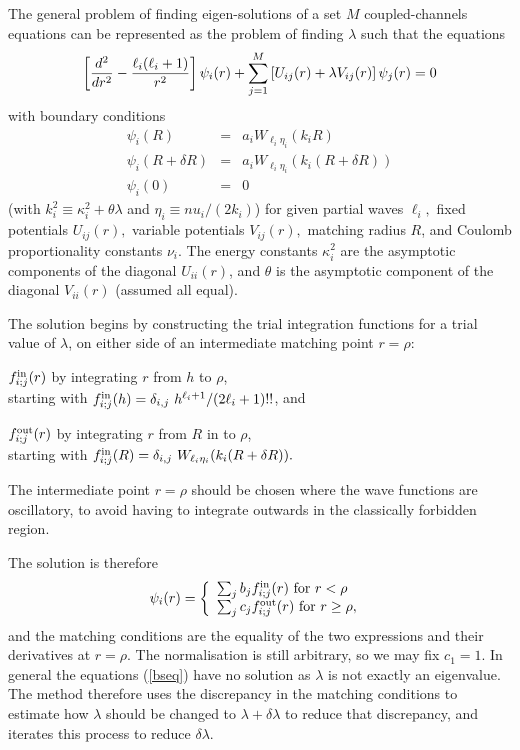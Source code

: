 \documentclass[11pt,a4paper]{article}
\begin{document}
The general problem of finding eigen-solutions of a set $M$
coupled-channels equations can be represented as the problem of finding
$\lambda$ such that the equations
\begin{eqnarray} \label{bseq}
\left [ {d^2 \over dr^2} -
        {\ell_i (\ell_i + 1) \over r^2} \right ]
 \psi_i (r)
 + \sum _ {j=1} ^M \left [ U_{ij} (r) + \lambda V_{ij} (r) \right ]
  \psi_j (r) = 0
\end{eqnarray}
with boundary conditions
\begin{eqnarray}
 \psi_i (R) &=& a_i W_{\ell_i \eta_i} (k_i R)  \\
 \psi_i (R + \delta R) &=& a_i W_{\ell_i \eta_i} (k_i
                              (R + \delta R))\\
 \psi_i (0) &=& 0
\end{eqnarray}
(with $k_i^2 \equiv\kappa^2_i + \theta \lambda$ and
 $\eta_i \equiv {nu_i} / (2 k_i)$)
for given partial waves $\ell_i ,$ fixed potentials
$U_{ij} (r),$ variable potentials $V_{ij} (r),$
matching radius $R$,
and Coulomb proportionality constants $\nu_i$.
The energy constants $\kappa^2_i$ are the asymptotic components
of the diagonal $U_{ii} (r) $, and $\theta$ is the asymptotic component
of the diagonal $V_{ii} (r) $ (assumed all equal).

The solution begins by constructing the trial integration functions for a
trial value of $\lambda$, on either side of an intermediate matching point
$r = \rho $:

$f_{i;j}^{\rm in} (r)$ by integrating $r$ from $h$ to $\rho$,\\
starting with $f_{i;j}^{\rm in} (h) = \delta_{i,j} ~
  h^{\ell_i + 1} / (2 \ell_i + 1)!! $,
and

$f_{i;j}^{\rm out} (r)$ by integrating $r$ from $R$ in to $\rho$,\\
starting with $f_{i;j}^{\rm in} (R) = \delta_{i,j} ~
  W_{\ell_i \eta_i} (k_i (R + \delta R)). $

The intermediate point $r = \rho $ should be chosen where the
wave functions are oscillatory, to avoid having to integrate outwards in
the classically forbidden region.

The solution is therefore
\begin{eqnarray} \label{eigencomp}
\psi_i (r) = \left \{ \begin{array}{ll}
                    \sum _ j  b_j f_{i;j}^{\rm in} (r)
                         \mbox{  for } r < \rho \\
                    \sum _ j c_j f_{i;j}^{\rm out} (r)
                         \mbox{  for } r \geq \rho ,
                      \end{array} \right. ~
\end{eqnarray}
and the matching conditions are the equality of the two expressions and
their derivatives at $ r = \rho $. The normalisation is still
arbitrary, so we may fix $ c_1 = 1$. In general the
equations (\ref{bseq}) have no solution as $\lambda$ is not exactly an eigenvalue.
The method therefore uses the discrepancy in the matching conditions to
estimate how $\lambda$ should be changed to $\lambda+\delta\lambda$ to
reduce that discrepancy, and iterates this process to reduce $\delta\lambda$.
\end{document}
